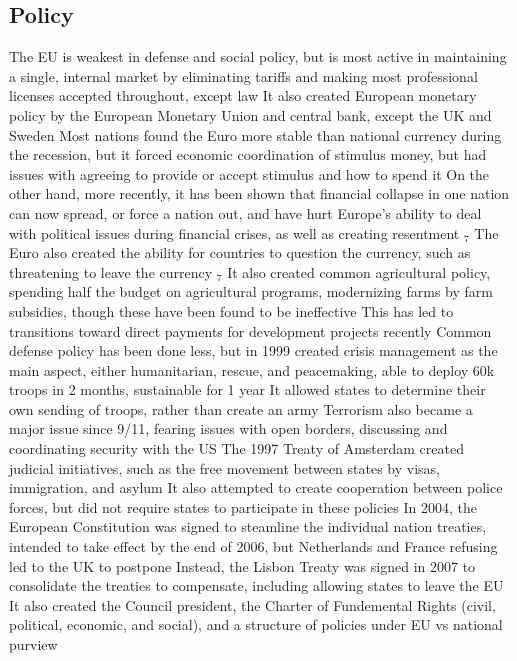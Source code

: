 \documentclass[11 pt, twoside]{article}
\newcommand{\foot}[1]{\hyperlink{#1}{$_#1$}}
\newenvironment{outline*}
{
	\begin{outline}[enumerate]
	}
	{\end{outline}
}
\begin{document}
\subsection{Policy}
\begin{outline*}
\1 The EU is weakest in defense and social policy, but is most active in maintaining a single, internal market by eliminating tariffs and making most professional licenses accepted throughout, except law
\1 It also created European monetary policy by the European Monetary Union and central bank, except the UK and Sweden
\2 Most nations found the Euro more stable than national currency during the recession, but it forced economic coordination of stimulus money, but had issues with agreeing to provide or accept stimulus and how to spend it
\2 On the other hand, more recently, it has been shown that financial collapse in one nation can now spread, or force a nation out, and have hurt Europe's ability to deal with political issues during financial crises, as well as creating resentment \foot{7}
\2 The Euro also created the ability for countries to question the currency, such as threatening to leave the currency \foot{7}
\1 It also created common agricultural policy, spending half the budget on agricultural programs, modernizing farms by farm subsidies, though these have been found to be ineffective
\2 This has led to transitions toward direct payments for development projects recently
\1 Common defense policy has been done less, but in 1999 created crisis management as the main aspect, either humanitarian, rescue, and peacemaking, able to deploy 60k troops in 2 months, sustainable for 1 year
\2 It allowed states to determine their own sending of troops, rather than create an army
\2 Terrorism also became a major issue since 9/11, fearing issues with open borders, discussing and coordinating security with the US
\1 The 1997 Treaty of Amsterdam created judicial initiatives, such as the free movement between states by visas, immigration, and asylum
\2 It also attempted to create cooperation between police forces, but did not require states to participate in these policies
\1 In 2004, the European Constitution was signed to steamline the individual nation treaties, intended to take effect by the end of 2006, but Netherlands and France refusing led to the UK to postpone
\2 Instead, the Lisbon Treaty was signed in 2007 to consolidate the treaties to compensate, including allowing states to leave the EU
\2 It also created the Council president, the Charter of Fundemental Rights (civil, political, economic, and social), and a structure of policies under EU vs national purview

\end{outline*}
\end{document}
